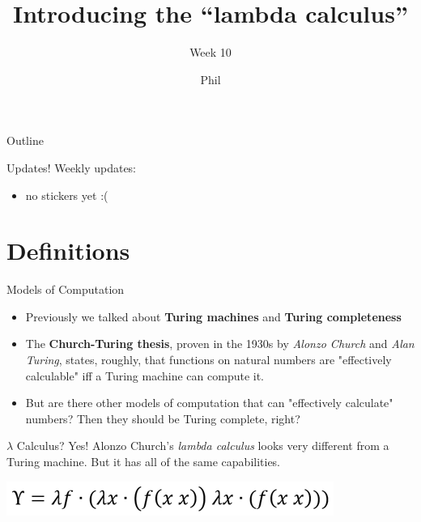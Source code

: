 \documentclass[aspectratio=169]{beamer}
\title{Introducing the ``lambda calculus''}
\subtitle{Week 10}
\author{Phil}
\date{}
\begin{document}

\begin{frame}
\titlepage
\end{frame}

\begin{frame}{Outline}
  \tableofcontents
\end{frame}

\begin{frame}{Updates!}
  Weekly updates: \pause
  \begin{itemize}
    \item no stickers yet :(
  \end{itemize}
\end{frame}

\section{Definitions}
\frame{\sectionpage}

\begin{frame}{Models of Computation}
    \begin{itemize}
        \item Previously we talked about \textbf{Turing machines} and \textbf{Turing completeness} \pause
        \item The \textbf{Church-Turing thesis}, proven in the 1930s by \textit{Alonzo Church} and \textit{Alan Turing}, states, roughly, that functions on natural numbers are "effectively calculable" iff a Turing machine can compute it. \pause
        \item But are there other models of computation that can "effectively calculate" numbers? Then they should be Turing complete, right?
    \end{itemize}
\end{frame}

\begin{frame}{$\lambda$ Calculus?}
    Yes! Alonzo Church's \textit{lambda calculus} looks very different from a Turing machine. But it has all of the same capabilities.
    \begin{center}
    \includegraphics[width=\textwidth]{images/y_combinator.png}
    \end{center}
\end{frame}
\end{document}
